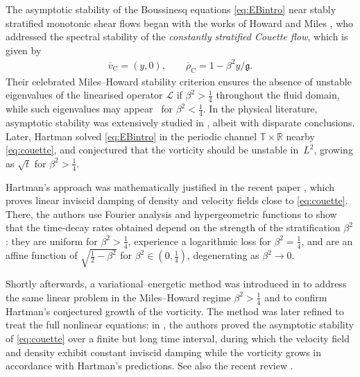 \documentclass[11pt,reqno]{amsproc}
\theoremstyle{definition}
\numberwithin{equation}{section}
\renewcommand{\L}{{\mathcal{L}}}
\newcommand{\R}{{\mathbb R}}
\newcommand{\T}{{\mathbb T}}
\renewcommand{\b}{\beta}
\begin{document}
The asymptotic stability of the Boussinesq equations \eqref{eq:EBintro} near stably stratified monotonic shear flows began with the works of Howard \cite{Howard} and Miles \cite{Miles}, who addressed the spectral stability of the \emph{constantly stratified Couette flow}, which is given by
\begin{align}\label{eq:couette}
\overline{v}_{\mathrm C}= (y,0), \qquad \overline{\rho}_{\mathrm C} = 1 - \beta^2 y/\mathfrak g.
\end{align}
Their celebrated Miles--Howard stability criterion ensures the absence of unstable eigenvalues of the linearised operator $\L$ if $ \beta^2 > \frac14$ throughout the fluid domain, while such eigenvalues may appear~\cite{drazin1958stability} for $ \beta^2 < \frac14$. In the physical literature,  asymptotic stability was extensively studied in \cite{brown1980algebraic, case1960stability, chimonas1979algebraic, dikii1960stability, farrell1993transient, hoiland1953dynamic, kuo1963perturbations}, albeit with disparate conclusions. Later, Hartman \cite{Hartman} solved \eqref{eq:EBintro} in the periodic channel $\T\times \R$ nearby \eqref{eq:couette}, and conjectured that the vorticity should be unstable in~$L^2$, growing as $\sqrt{t}$ for $\beta^2>\frac14$.

Hartman's approach was mathematically justified in the recent paper \cite{YL18}, which proves linear inviscid damping of density and velocity fields close to \eqref{eq:couette}. There, the authors use Fourier analysis and hypergeometric functions to show that the time-decay rates obtained depend on the strength of the stratification $ \beta^2$: they are uniform for $ \beta^2>\frac14$,  experience a logarithmic loss for $\beta^2=\frac14$, and are an affine function of $\sqrt{\frac12- \b^2}$ for $ \beta^2\in (0,\frac14)$, degenerating as $ \beta^2\rightarrow 0$. 

Shortly afterwards, a variational–energetic method was introduced in \cite{BCZD22} to address the same linear problem in the Miles–Howard regime $\beta^{2} > \tfrac{1}{4}$ and to confirm Hartman’s conjectured growth of the vorticity. The method was later refined to treat the full nonlinear equations: in \cite{BBCZD21}, the authors proved the asymptotic stability of \eqref{eq:couette} over a finite but long time interval, during which the velocity field and density exhibit constant inviscid damping while the vorticity grows in accordance with Hartman's predictions. See also the recent review \cite{bianchini2022symmetrization}.
\end{document}
